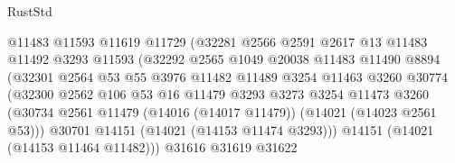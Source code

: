 \begin{lexlean}{RustStd}
\begin{coremodule}
                                  @11483
                                  @11593
                                  @11619
                                  @11729
                                  (@32281
                                    @2566
                                    @2591
                                    @2617
                                    @13
                                    @11483
                                    @11492
                                    @3293
                                    @11593
                                    (@32292
                                      @2565
                                      @1049
                                      @20038
                                      @11483
                                      @11490
                                      @8894
                                      (@32301
                                        @2564
                                        @53
                                        @55
                                        @3976
                                        @11482
                                        @11489
                                        @3254
                                        @11463
                                        @3260
                                        @30774
                                        (@32300
                                          @2562
                                          @106
                                          @53
                                          @16
                                          @11479
                                          @3293
                                          @3273
                                          @3254
                                          @11473
                                          @3260
                                          (@30734
                                            @2561
                                            @11479
                                            (@14016 (@14017 @11479))
                                            (@14021 (@14023 @2561 @53)))
                                          @30701
                                          @14151
                                          (@14021 (@14153 @11474 @3293)))
                                        @14151
                                        (@14021 (@14153 @11464 @11482)))
                                      @31616
                                      @31619
                                      @31622

\end{coremodule}
\end{lexlean}
